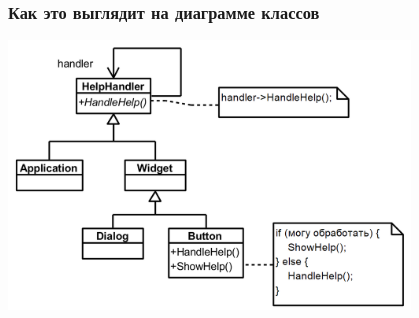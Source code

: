 \documentclass[xetex,mathserif,serif]{beamer}
\begin{document}
    \begin{frame}
        \frametitle{Как это выглядит на диаграмме классов}
        \begin{center}
            \includegraphics[width=0.8\textwidth]{chainOfResponsibilityExampleClasses.png}
        \end{center}
    \end{frame}
\end{document}
